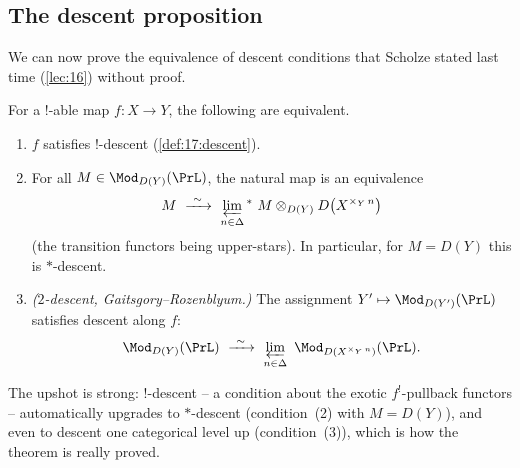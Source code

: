 \subsection{The descent proposition}
\label{subsec:17:proposition}

We can now prove the equivalence of descent conditions that Scholze stated last time
(\cref{lec:16}) without proof.

\begin{proposition}
\label{prop:17:descent-tfae}
For a $!$-able map $f\colon X\to Y$, the following are equivalent.
\begin{enumerate}
\item $f$ satisfies $!$-descent (\cref{def:17:descent}).
\item For all $M\in\Mod_{D(Y)}(\PrL)$, the natural map is an equivalence
\begin{equation*}
M\ \xrightarrow{\ \sim\ }\ \varprojlim_{n\in\Delta}{}^{*}\ M\otimes_{D(Y)}D\bigl(X^{\times_{Y}\,n}\bigr)
\end{equation*}
(the transition functors being upper-stars). In particular, for $M=D(Y)$ this is $*$-descent.
\item \emph{($2$-descent, Gaitsgory--Rozenblyum.)} The assignment $Y'\mapsto\Mod_{D(Y')}(\PrL)$
satisfies descent along $f$:
\begin{equation*}
\Mod_{D(Y)}(\PrL)\ \xrightarrow{\ \sim\ }\ \varprojlim_{n\in\Delta}\ \Mod_{D(X^{\times_{Y}\,n})}(\PrL).
\end{equation*}
\end{enumerate}
\end{proposition}

The upshot is strong: $!$-descent -- a condition about the exotic $f^{!}$-pullback functors --
automatically upgrades to $*$-descent (condition~(2) with $M=D(Y)$), and even to descent one
categorical level up (condition~(3)), which is how the theorem is really proved.

